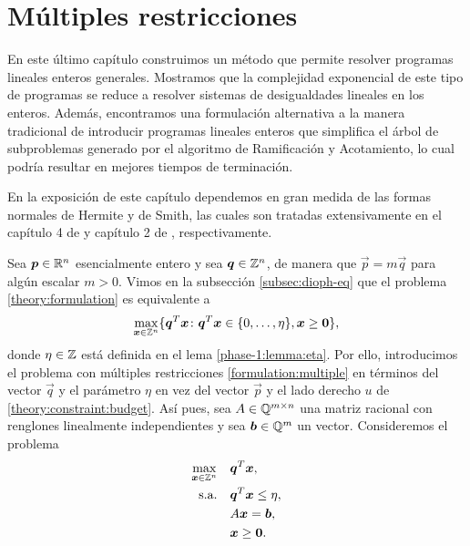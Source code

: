 \chapter{Múltiples restricciones}
\noindent
En este último capítulo construimos un método que permite resolver programas lineales enteros
generales. Mostramos que la complejidad exponencial de este tipo de programas se reduce a resolver
sistemas de desigualdades lineales en los enteros. Además, encontramos una formulación alternativa a
la manera tradicional de introducir programas lineales enteros que simplifica el árbol de
subproblemas generado por el algoritmo de Ramificación y Acotamiento, lo cual podría resultar en
mejores tiempos de terminación.

En la exposición de este capítulo dependemos en gran medida de las formas normales de Hermite y de
Smith, las cuales son tratadas extensivamente en el capítulo 4 de \cite{alex} y capítulo 2 de
\cite{morris}, respectivamente.

Sea $\boldsymbol{p} \in \mathbb{R}^n$ esencialmente entero y sea $\boldsymbol{q} \in \mathbb{Z}^n$, de manera que $\vec{p} =
m\vec{q}$ para algún escalar $m > 0$. Vimos en la subsección \ref{subsec:dioph-eq} que el problema
\eqref{theory:formulation} es equivalente a
\begin{equation*}
	\max_{\boldsymbol{x} \in \mathbb{Z}^n}
	\lbrace \boldsymbol{q}^T\boldsymbol{x} \colon \boldsymbol{q}^T\boldsymbol{x} \in \lbrace 0, \ldots, \eta \rbrace, \boldsymbol{x}
	\geq \boldsymbol{0} \rbrace,
\end{equation*}
donde $\eta \in \mathbb{Z}$ está definida en el lema \ref{phase-1:lemma:eta}. Por ello, introducimos el
problema con múltiples restricciones \eqref{formulation:multiple} en términos del vector $\vec{q}$ y
el parámetro $\eta$ en vez del vector $\vec{p}$ y el lado derecho $u$ de
\eqref{theory:constraint:budget}. Así pues, sea $A \in \mathbb{Q}^{m \times n}$ una matriz racional con
renglones linealmente independientes y sea $\boldsymbol{b} \in \mathbb{Q}^m$ un vector. Consideremos el problema
\begin{subequations}
	\label{formulation:multiple}
	\begin{align}
		\max_{\boldsymbol{x} \in \mathbb{Z}^n} \quad
			& \boldsymbol{q}^T\boldsymbol{x}, \label{formulation:multiple:objective} \\
		\text{s.a.} \quad
			& \boldsymbol{q}^T\boldsymbol{x} \leq \eta, \label{formulation:multiple:constraint:budget} \\
			& A\boldsymbol{x} = \boldsymbol{b}, \label{formulation:multiple:constraints} \\
			& \boldsymbol{x} \geq \boldsymbol{0}. \nonumber
	\end{align}
\end{subequations}

